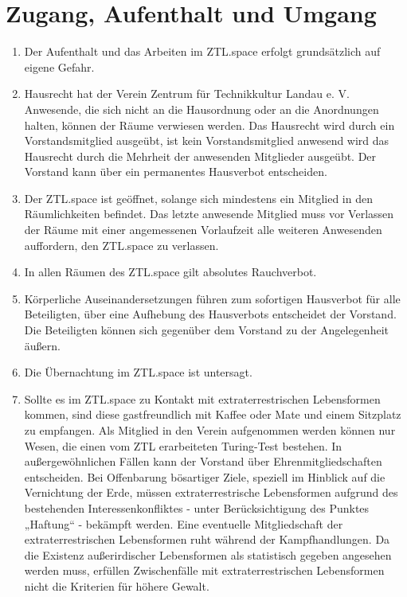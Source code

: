 \documentclass[a4paper, 12pt, numbers=withenddot,]{scrartcl}
\begin{document}
\newpage

\section{Zugang, Aufenthalt und Umgang}
\begin{enumerate}[label=\alph*)]
	\item Der Aufenthalt und das Arbeiten im ZTL.space erfolgt grundsätzlich auf eigene
Gefahr.
	\item Hausrecht hat der Verein Zentrum für Technikkultur Landau e. V. Anwesende, die
sich nicht an die Hausordnung oder an die Anordnungen halten, können der
Räume verwiesen werden. Das Hausrecht wird durch ein Vorstandsmitglied
ausgeübt, ist kein Vorstandsmitglied anwesend wird das Hausrecht durch die
Mehrheit der anwesenden Mitglieder ausgeübt. Der Vorstand kann über ein
permanentes Hausverbot entscheiden.
	\item Der ZTL.space ist geöffnet, solange sich mindestens ein Mitglied in den
Räumlichkeiten befindet. Das letzte anwesende Mitglied muss vor Verlassen der
Räume mit einer angemessenen Vorlaufzeit alle weiteren Anwesenden auffordern,
den ZTL.space zu verlassen.
	\item In allen Räumen des ZTL.space gilt absolutes Rauchverbot.
	\item Körperliche Auseinandersetzungen führen zum sofortigen Hausverbot für alle
Beteiligten, über eine Aufhebung des Hausverbots entscheidet der Vorstand. Die
Beteiligten können sich gegenüber dem Vorstand zu der Angelegenheit äußern.
	\item Die Übernachtung im ZTL.space ist untersagt.
	\item Sollte es im ZTL.space zu Kontakt mit extraterrestrischen Lebensformen kommen,
sind diese gastfreundlich mit Kaffee oder Mate und einem Sitzplatz zu empfangen.
Als Mitglied in den Verein aufgenommen werden können nur Wesen, die einen
vom ZTL erarbeiteten Turing-Test bestehen. In außergewöhnlichen Fällen kann
der Vorstand über Ehrenmitgliedschaften entscheiden. Bei Offenbarung bösartiger
Ziele, speziell im Hinblick auf die Vernichtung der Erde, müssen extraterrestrische
Lebensformen aufgrund des bestehenden Interessenkonfliktes - unter
Berücksichtigung des Punktes „Haftung“ - bekämpft werden. Eine eventuelle
Mitgliedschaft der extraterrestrischen Lebensformen ruht während der
Kampfhandlungen. Da die Existenz außerirdischer Lebensformen als statistisch
gegeben angesehen werden muss, erfüllen Zwischenfälle mit extraterrestrischen
Lebensformen nicht die Kriterien für höhere Gewalt.
\end{enumerate}
\end{document}

